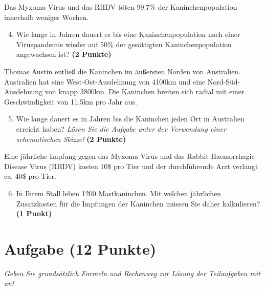 \documentclass[a4paper, 9pt]{scrartcl}\usepackage[]{graphicx}\usepackage[]{xcolor}
\begin{document}
Das Myxoma Virus und das RHDV töten 99.7\% der Kaninchenpopulation innerhalb weniger Wochen.

\begin{enumerate}
  \setcounter{enumi}{3}  
\item Wie lange in Jahren dauert es bis eine Kaninchenpopulation nach einer Viruspandemie wieder auf 50\% der gesättigten Kaninchenpopulation angewachsen ist?  \textbf{(2 Punkte)}
\end{enumerate}

Thomas Austin entließ die Kaninchen im äußersten Norden von Australien. Australien hat eine West-Ost-Ausdehnung von 4100km und eine Nord-Süd-Ausdehnung von knapp 3800km. Die Kaninchen breiten sich radial mit einer Geschwindigkeit von 11.5km pro Jahr aus.

\begin{enumerate}
  \setcounter{enumi}{4}
\item Wie lange dauert es in Jahren bis die Kaninchen jeden Ort in Australien erreicht haben? \textit{Lösen Sie die Aufgabe unter der Verwendung einer schematischen Skizze!} \textbf{(2 Punkte)}
\end{enumerate}

Eine jährliche Impfung gegen das Myxoma Virus und das Rabbit Haemorrhagic Disease Virus (RHDV) kosten 10\$ pro Tier und der durchführende Arzt verlangt ca. 40\$ pro Tier.

\begin{enumerate}
  \setcounter{enumi}{5}
\item In Ihrem Stall leben 1200 Mastkaninchen. Mit welchen jährlichen Zusatzkosten für die Impfungen der Kaninchen müssen Sie daher kalkulieren? \textbf{(1 Punkt)}
\end{enumerate}
 
\clearpage

\section{Aufgabe \hfill (12 Punkte)}

\textit{Geben Sie grundsätzlich Formeln und Rechenweg zur Lösung der Teilaufgaben mit an!} \\[1Ex]
 
\end{document}
